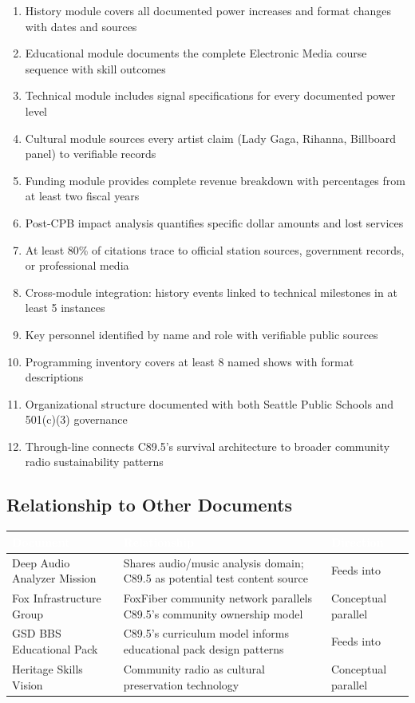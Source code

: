 \documentclass[11pt,letterpaper]{article}
\newcommand{\tableheader}[1]{\textbf{\sffamily\textcolor{white}{#1}}}
\begin{document}
\begin{enumerate}[leftmargin=2em]
\item History module covers all documented power increases and format changes with dates and sources
\item Educational module documents the complete Electronic Media course sequence with skill outcomes
\item Technical module includes signal specifications for every documented power level
\item Cultural module sources every artist claim (Lady Gaga, Rihanna, Billboard panel) to verifiable records
\item Funding module provides complete revenue breakdown with percentages from at least two fiscal years
\item Post-CPB impact analysis quantifies specific dollar amounts and lost services
\item At least 80\% of citations trace to official station sources, government records, or professional media
\item Cross-module integration: history events linked to technical milestones in at least 5 instances
\item Key personnel identified by name and role with verifiable public sources
\item Programming inventory covers at least 8 named shows with format descriptions
\item Organizational structure documented with both Seattle Public Schools and 501(c)(3) governance
\item Through-line connects C89.5's survival architecture to broader community radio sustainability patterns
\end{enumerate}

\subsection{Relationship to Other Documents}

\begin{center}
\begin{tabularx}{\textwidth}{L{4cm}XC{2.5cm}}
\toprule
{}
\tableheader{Document} & \tableheader{Relationship} & \tableheader{Direction} \\
\midrule
Deep Audio Analyzer Mission & Shares audio/music analysis domain; C89.5 as potential test content source & Feeds into \\
Fox Infrastructure Group & FoxFiber community network parallels C89.5's community ownership model & Conceptual parallel \\
GSD BBS Educational Pack & C89.5's curriculum model informs educational pack design patterns & Feeds into \\
Heritage Skills Vision & Community radio as cultural preservation technology & Conceptual parallel \\
\bottomrule
\end{tabularx}
\end{center}
\end{document}
